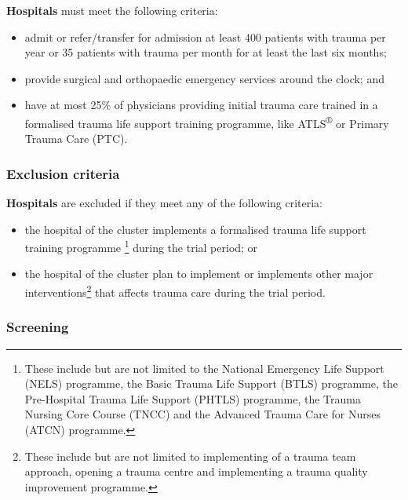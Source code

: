 \documentclass[
]{scrartcl}
\providecommand{\tightlist}{%
  \setlength{\itemsep}{0pt}\setlength{\parskip}{0pt}}\usepackage{longtable,booktabs,array}
\begin{document}
\textbf{Hospitals} must meet the following criteria:

\begin{itemize}
\tightlist
\item
  admit or refer/transfer for admission at least 400 patients with
  trauma per year or 35 patients with trauma per month for at least the
  last six months;
\item
  provide surgical and orthopaedic emergency services around the clock;
  and
\item
  have at most 25\% of physicians providing initial trauma care trained
  in a formalised trauma life support training programme, like
  ATLS\textsuperscript{®} or Primary Trauma Care (PTC).
\end{itemize}

\hypertarget{exclusion-criteria}{%
\subsubsection{Exclusion criteria}\label{exclusion-criteria}}

\textbf{Hospitals} are excluded if they meet any of the following
criteria:

\begin{itemize}
\tightlist
\item
  the hospital of the cluster implements a formalised trauma life
  support training programme \footnote{These include but are not limited
    to the National Emergency Life Support (NELS) programme, the Basic
    Trauma Life Support (BTLS) programme, the Pre-Hospital Trauma Life
    Support (PHTLS) programme, the Trauma Nursing Core Course (TNCC) and
    the Advanced Trauma Care for Nurses (ATCN) programme.} during the
  trial period; or
\item
  the hospital of the cluster plan to implement or implements other
  major interventions\footnote{These include but are not limited to
    implementing of a trauma team approach, opening a trauma centre and
    implementing a trauma quality improvement programme.} that affects
  trauma care during the trial period.
\end{itemize}

\hypertarget{screening}{%
\subsubsection{Screening}\label{screening}}
\end{document}
